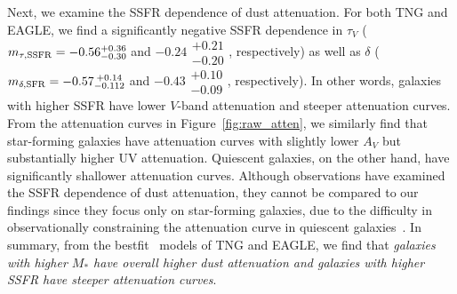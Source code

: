 Next, we examine the SSFR dependence of dust attenuation. For both TNG and
EAGLE, we find a significantly negative SSFR dependence in $\tau_V$ 
($m_{\tau,{\rm SSFR}} = -0.56\substack{+0.36 \\ -0.30}$ and
$-0.24\substack{+0.21 \\ -0.20}$, respectively) as well as $\delta$ 
($m_{\delta,{\rm SFR}} = -0.57\substack{+0.14 \\ -0.112}$ and $-0.43\substack{+0.10 \\ -0.09}$,
respectively). In other words, galaxies with higher SSFR have lower $V$-band
attenuation and steeper attenuation curves. From the attenuation curves in
Figure~\ref{fig:raw_atten}, we similarly find that star-forming galaxies have
attenuation curves with slightly lower $A_V$ but substantially higher UV 
attenuation. Quiescent galaxies, on the other hand, have significantly 
shallower attenuation curves. Although observations have examined the
SSFR dependence of dust attenuation, they cannot be compared to our findings since
they focus only on star-forming galaxies, due to the difficulty in
observationally constraining the attenuation curve in quiescent
galaxies~\citep[\eg][]{garn2010, reddy2015, battisti2016, battisti2017, salim2018}. 
In summary, from the bestfit \eda~models of TNG and EAGLE, we find that
\emph{galaxies with higher $M_*$ have overall higher dust attenuation and
galaxies with higher SSFR have steeper attenuation curves}.
